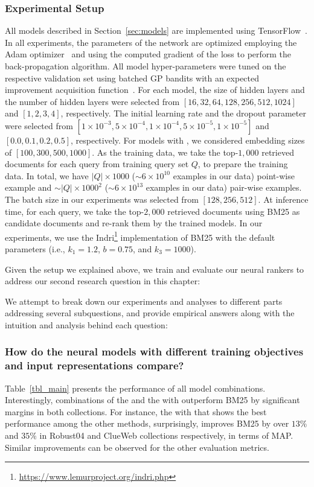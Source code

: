 \subsubsection{Experimental Setup}
All models described in Section~\ref{sec:models} are implemented using TensorFlow~\citep{tang2016:tflearn,tensorflow2015-whitepaper}.
In all experiments, the parameters of the network are optimized employing the Adam optimizer~\citep{Kingma:2014} and using the computed gradient of the loss to perform the back-propagation algorithm.
All model hyper-parameters were tuned on the respective validation set using batched GP bandits with an expected improvement acquisition function~\citep{Desautels:2014}. 
For each model, the size of hidden layers and the number of hidden layers were selected from $[16, 32, 64, 128, 256, 512, 1024]$ and $[1, 2, 3, 4]$, respectively. The initial learning rate and the dropout parameter were selected from $[1\times 10^{-3}, 5\times 10^{-4}, 1\times 10^{-4}, 5\times 10^{-5}, 1\times 10^{-5}]$ and $[0.0, 0.1, 0.2, 0.5]$, respectively. For models with \feedthree, we considered embedding sizes of $[100, 300, 500, 1000]$. As the training data, we take the top-$1,000$ retrieved documents for each query from training query set $Q$, to prepare the training data. In total, we have $|Q|\times 1000$ ($\sim6\times 10^{10}$ examples in our data) point-wise example and $\sim|Q|\times 1000^2$ ($\sim6\times 10^{13}$ examples in our data) pair-wise examples. The batch size in our experiments was selected from  $[128, 256, 512]$.
%
At inference time, for each query, we take the top-$2,000$ retrieved documents using BM25 as candidate documents and re-rank them by the trained models. In our experiments, we use the Indri\footnote{\url{https://www.lemurproject.org/indri.php}} implementation of BM25 with the default parameters (i.e., $k_1 = 1.2$, $b = 0.75$, and $k_3 = 1000$).


\bigskip
Given the setup we explained above, we train and evaluate our neural rankers to address our second research question in this chapter:

We attempt to break down our experiments and analyses to different parts addressing several subquestions, and provide empirical answers along with the intuition and analysis behind each question:

 
\subsubsection{How do the neural models with different training objectives and input representations compare?}
%
Table~\ref{tbl_main} presents the performance of all model combinations.
Interestingly, combinations of the \modeltwo and the \modelthree with \feedthree outperform BM25 by significant margins in both collections. For instance, the \modelthree with \feedthree that shows the best performance among the other methods, surprisingly, improves BM25 by over $13\%$ and $35\%$ in Robust04 and ClueWeb collections respectively, in terms of MAP. Similar improvements can be observed for the other evaluation metrics.

